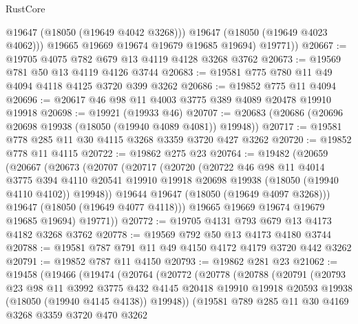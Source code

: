 \begin{lexlean}{RustCore}
\begin{coremodule}
              @19647
              (@18050 (@19649 @4042 @3268)))
            @19647
            (@18050 (@19649 @4023 @4062)))
          @19665
          @19669
          @19674
          @19679
          @19685
          @19694)
        @19771))
@20667 := @19705 @4075 @782 @679 @13 @4119 @4128 @3268 @3762
@20673 := @19569 @781 @50 @13 @4119 @4126 @3744
@20683 := @19581 @775 @780 @11 @49 @4094 @4118 @4125 @3720 @399 @3262
@20686 := @19852 @775 @11 @4094
@20696 := @20617 @46 @98 @11 @4003 @3775 @389 @4089 @20478 @19910 @19918
@20698 := @19921 (@19933 @46)
@20707 := @20683 (@20686 (@20696 @20698 @19938 (@18050 (@19940 @4089 @4081)) @19948))
@20717 := @19581 @778 @285 @11 @30 @4115 @3268 @3359 @3720 @427 @3262
@20720 := @19852 @778 @11 @4115
@20722 := @19862 @275 @23
@20764 := @19482
    (@20659
      (@20667
        (@20673
          (@20707
            (@20717
              (@20720
                (@20722
                  @46
                  @98
                  @11
                  @4014
                  @3775
                  @394
                  @4110
                  @20541
                  @19910
                  @19918
                  @20698
                  @19938
                  (@18050 (@19940 @4110 @4102))
                  @19948))
              @19644
              @19647
              (@18050 (@19649 @4097 @3268)))
            @19647
            (@18050 (@19649 @4077 @4118)))
          @19665
          @19669
          @19674
          @19679
          @19685
          @19694)
        @19771))
@20772 := @19705 @4131 @793 @679 @13 @4173 @4182 @3268 @3762
@20778 := @19569 @792 @50 @13 @4173 @4180 @3744
@20788 := @19581 @787 @791 @11 @49 @4150 @4172 @4179 @3720 @442 @3262
@20791 := @19852 @787 @11 @4150
@20793 := @19862 @281 @23
@21062 := @19458
    (@19466
      (@19474
        (@20764
          (@20772
            (@20778
              (@20788
                (@20791
                  (@20793
                    @23
                    @98
                    @11
                    @3992
                    @3775
                    @432
                    @4145
                    @20418
                    @19910
                    @19918
                    @20593
                    @19938
                    (@18050 (@19940 @4145 @4138))
                    @19948))
                (@19581
                  @789
                  @285
                  @11
                  @30
                  @4169
                  @3268
                  @3359
                  @3720
                  @470
                  @3262

\end{coremodule}
\end{lexlean}

